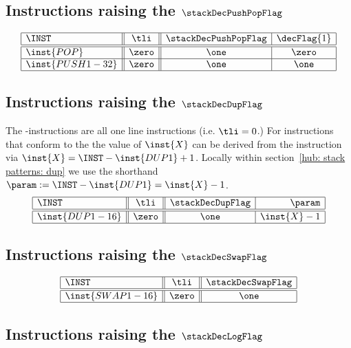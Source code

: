 \subsection{Instructions raising the $\stackDecPushPopFlag$}
\label{hub: instruction handling: PushPop}

\[
\begin{array}{|l||c||c|c|}
	\hline
	\INST			& \tli	& \stackDecPushPopFlag	& \decFlag{1}	\\ \hline\hline
	\inst{POP}		& \zero	& \one 				& \zero			\\ \hline
	\inst{PUSH1-32}	& \zero	& \one				& \one			\\ \hline
\end{array}
\]

\subsection{Instructions raising the $\stackDecDupFlag$}
\label{hub: instruction handling: Dup}

The -instructions are all one line instructions (i.e. $\tli = 0$.) For instructions that conform to the \dupSP{} the value of $\inst{X}$ can be derived from the instruction via $\inst{X} = \INST - \inst{DUP1} + 1$. Locally within section~\ref{hub: stack patterns: dup} we use the shorthand $\param := \INST - \inst{DUP1} = \inst{X} - 1$.
\[
\begin{array}{|l||c||c|r|}
	\hline
	\INST			& \tli	& \stackDecDupFlag	& \param		\\ \hline\hline
	\inst{DUP1-16}	& \zero	& \one			& \inst{X} - 1	\\ \hline
\end{array}
\]

\subsection{Instructions raising the $\stackDecSwapFlag$}
\label{hub: instruction handling: Swap}

\[
\begin{array}{|l||c||c|}
	\hline
	\INST			& \tli	& \stackDecSwapFlag	\\ \hline\hline
	\inst{SWAP1-16}	& \zero	& \one			\\ \hline
\end{array}
\]

\subsection{Instructions raising the $\stackDecLogFlag$}
\label{hub: instruction handling: Log}

